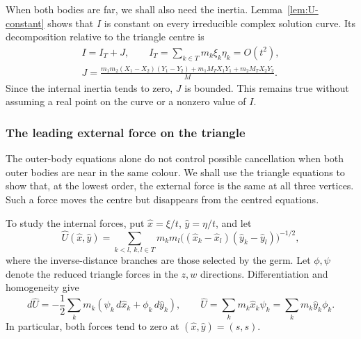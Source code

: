 \documentclass[11pt]{amsart}
\theoremstyle{definition}
\theoremstyle{remark}
\begin{document}
{When both bodies are far, we shall also need the inertia.
Lemma~\ref{lem:U-constant} shows that $I$ is constant on every irreducible
complex solution curve.  Its decomposition relative to the triangle centre is
\begin{equation}\label{d5-eq-inertia}
 \begin{gathered}
 I=I_T+J,\qquad I_T=\sum_{k\in T}m_k\xi_k\eta_k=O(t^2),\\
 J=\frac{m_1m_2(X_1-X_2)(Y_1-Y_2)+m_1M_TX_1Y_1+m_2M_TX_2Y_2}{M}.
 \end{gathered}
\end{equation}
Since the internal inertia tends to zero, $J$ is bounded.  This remains true
without assuming a real point on the curve or a nonzero value of $I$.

\subsubsection{The leading external force on the triangle}\label{d5-mb}
The outer-body equations alone do not control possible cancellation when
both outer bodies are near in the same colour.  We shall use the triangle
equations to show that, at the lowest order, the external force is the same
at all three vertices.  Such a force moves the centre but disappears from
the centred equations.

To study the internal forces, put $\hat x=\xi/t$, $\hat y=\eta/t$, and let
\[
 \widehat U(\hat x,\hat y)=\sum_{k<l,\ k,l\in T}m_km_l
 \bigl((\hat x_k-\hat x_l)(\hat y_k-\hat y_l)\bigr)^{-1/2},
\]
where the inverse-distance branches are those selected by the germ.
Let $\phi,\psi$ denote the reduced triangle forces in the $z,w$ directions.
Differentiation and homogeneity give
\begin{equation}\label{d5-eq-potential-identities}
 d\widehat U=-\frac12\sum_km_k(\psi_k\,d\hat x_k+\phi_k\,d\hat y_k),
 \qquad
 \widehat U=\sum_km_k\hat x_k\psi_k=\sum_km_k\hat y_k\phi_k.
\end{equation}
In particular, both forces tend to zero at $(\hat x,\hat y)=(s,s)$.

}
\end{document}

